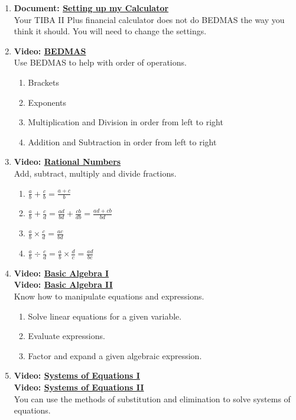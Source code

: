 \documentclass[
]{book}
\providecommand{\tightlist}{%
  \setlength{\itemsep}{0pt}\setlength{\parskip}{0pt}}
\begin{document}
\begin{enumerate}
\def\labelenumi{\arabic{enumi}.}
\item
  \textbf{Document: \href{https://www.wikihow.com/Set-Decimal-Places-on-a-TI-BA-II-Plus-Calculator}{Setting up my Calculator}}\\
  Your TIBA II Plus financial calculator does not do BEDMAS the way you think it should. You will need to change the settings.
\item
  \textbf{Video: \href{https://youtu.be/ezGExislcbU}{BEDMAS}}\\
  Use BEDMAS to help with order of operations.

  \begin{enumerate}
  \def\labelenumii{\arabic{enumii}.}
  \tightlist
  \item
    Brackets
  \item
    Exponents
  \item
    Multiplication and Division in order from left to right
  \item
    Addition and Subtraction in order from left to right
  \end{enumerate}
\item
  \textbf{Video: \href{https://youtu.be/Yf2jnQHyHdQ}{Rational Numbers}}\\
  Add, subtract, multiply and divide fractions.

  \begin{enumerate}
  \def\labelenumii{\arabic{enumii}.}
  \tightlist
  \item
    \(\frac{a}{b} + \frac{c}{b} = \frac{a+c}{b}\)
  \item
    \(\frac{a}{b} + \frac{c}{d} = \frac{ad}{bd} + \frac{cb}{db} =  \frac{ad + cb}{bd}\)
  \item
    \(\frac{a}{b} \times \frac{c}{d} = \frac{ac}{bd}\)
  \item
    \(\frac{a}{b} \div \frac{c}{d} = \frac{a}{b} \times \frac{d}{c} = \frac{ad}{bc}\)
  \end{enumerate}
\item
  \textbf{Video: \href{https://youtu.be/i8xFdGZ5zOU}{Basic Algebra I}}\\
  \textbf{Video: \href{https://youtu.be/Vb_2Aqq08ok}{Basic Algebra II}}\\
  Know how to manipulate equations and expressions.

  \begin{enumerate}
  \def\labelenumii{\arabic{enumii}.}
  \tightlist
  \item
    Solve linear equations for a given variable.
  \item
    Evaluate expressions.
  \item
    Factor and expand a given algebraic expression.
  \end{enumerate}
\item
  \textbf{Video: \href{https://youtu.be/ooUss4RfLHI}{Systems of Equations I}}\\
  \textbf{Video: \href{https://youtu.be/rDDTETJjmyY}{Systems of Equations II}}\\
  You can use the methods of substitution and elimination to solve systems of equations.


\end{enumerate}
\end{document}
